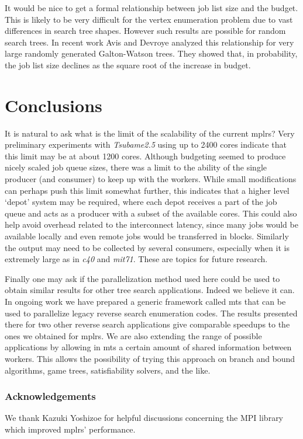 \documentclass[a4paper,11pt]{article}   \usepackage{authblk} \usepackage[top=1.9cm,bottom=1.9cm,left=1.9cm,right=1.9cm]{geometry}
\newcommand{\progname}{\textsf}
\newcommand{\compname}{\emph}
\newcommand{\mplrs}{\progname{mplrs}\xspace}
\newcommand{\mts}{\progname{mts}\xspace}
\newcommand{\tsubame}{\compname{Tsubame2.5}\xspace}
\newcommand{\polytope}{\emph}
\newcommand{\cforty}{\polytope{c40}\xspace}
\newcommand{\mitseven}{\polytope{mit71}\xspace}
\begin{document}
It would be nice to get a formal relationship between job list size and the budget.
This is likely to be very difficult for the vertex enumeration problem due to vast
differences in search tree shapes. However such results are possible for random
search trees.
In recent work Avis and Devroye \cite{AD17a} analyzed this relationship for 
very large randomly generated Galton-Watson trees.
They showed that, in probability,
the job list size declines as the square root of the increase in budget.

\section{Conclusions}
\label{conclusions}
It is natural to ask what is the limit of the scalability of the current \mplrs?
Very preliminary experiments with \tsubame using up to 2400 cores indicate that this limit may be 
at about 1200 cores. Although budgeting seemed to produce nicely scaled job queue sizes,
there was a limit to the ability of the single producer (and consumer) to keep up with the workers.
While small modifications can perhaps push this limit somewhat further,
this indicates that a higher level `depot' system may be required, where each depot
receives a part of the job queue and acts as a producer with a subset of the available cores.
This could also help avoid overhead related to the interconnect latency, since
many jobs would be available locally and even remote jobs would be transferred 
in blocks.
Similarly the output may need to be collected by several consumers, especially when it is 
extremely large as in \cforty and \mitseven. These are topics for future research.

Finally one may ask if the parallelization method used here could be used
to obtain similar results for other tree search applications.
Indeed we believe it can. In ongoing work \cite{AJ16a} we have prepared a generic framework
called \mts that can be used to parallelize legacy reverse search enumeration codes.
The results presented there for two other reverse search applications
give comparable speedups to the ones we obtained for \mplrs.
We are also extending the range of possible applications by allowing
in \mts a certain amount of shared
information between workers. This allows the possibility of trying this approach
on branch and bound algorithms, game trees, satisfiability solvers, and the like.

\subsubsection*{Acknowledgements}
We thank Kazuki Yoshizoe for
helpful discussions concerning the MPI library
which improved \mplrs' performance.




\end{document}
